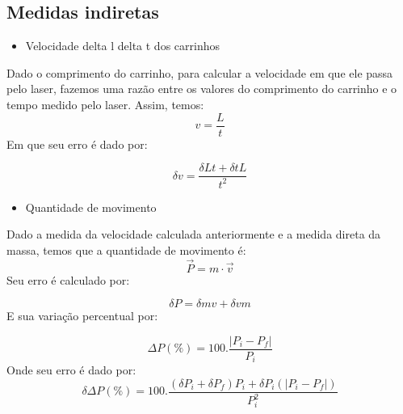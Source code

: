 \documentclass[12pt, twoside]{article}
\begin{document}
    \subsection{Medidas indiretas}

    
    \begin{itemize}
        \item Velocidade delta l delta t dos carrinhos
        \end{itemize}

Dado o comprimento do carrinho, para calcular a velocidade em que ele passa pelo laser, fazemos uma razão entre os valores do comprimento do carrinho e o tempo medido pelo laser. Assim, temos:
        \begin{equation}
        \label{Materiais_Equacao_velocidade}
            v = \frac{L}{t}
        \end{equation}
        Em que seu erro é dado por:

        \begin{equation}
        \label{Materiais_Erro_Equacao_velocidade}
            \delta v = \frac{\delta L t + \delta t L}{t^2}
        \end{equation}
        

        \begin{itemize}
        \item Quantidade de movimento
        \end{itemize}

Dado a medida da velocidade calculada anteriormente e a medida direta da massa, temos que a quantidade de movimento é:
        \begin{equation}
        \label{Materiais_equacao_quantidade_de_movimento}
            \vec{P} = m\cdot \vec{v}
        \end{equation}
Seu erro é calculado por:

\begin{equation}
        \label{Materiais_erro_equacao_quantidade_de_movimento}
            \delta{P} = \delta{m}v + \delta{v}m
        \end{equation}
E sua variação percentual por:

        \begin{equation}
        \label{Materiais_percentual1_quantidade_de_movimento}
            \Delta{P}(\%) = 100 . \frac{|P_i - P_f|}{P_i}
        \end{equation}
Onde seu erro é dado por:
\begin{equation}
        \label{Materiais_erro_percentual1_quantidade_de_movimento}
            \delta\Delta{P}(\%) = 100 . \frac{(\delta P_i + \delta P_f)P_i + \delta P_i(|P_i - P_f|)}{P_i^2}
        \end{equation}
\end{document}
